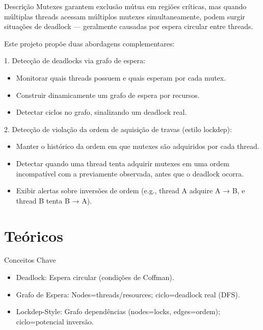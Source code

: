 \documentclass{beamer}
\begin{document}
\begin{frame}{Descrição}
Mutexes garantem exclusão mútua em regiões críticas, mas
quando múltiplas threads acessam múltiplos mutexes
simultaneamente, podem surgir situações de deadlock —
geralmente causadas por espera circular entre threads.

Este projeto propõe duas abordagens complementares:

\item 1. Detecção de deadlocks via grafo de espera:
\begin{itemize}
    \item Monitorar quais threads possuem e quais esperam por cada mutex.
    \item Construir dinamicamente um grafo de espera por recursos.
    \item Detectar ciclos no grafo, sinalizando um deadlock real.
\end{itemize}

\item 2. Detecção de violação da ordem de aquisição de travas (estilo lockdep):
\begin{itemize}
    \item Manter o histórico da ordem em que mutexes são adquiridos por cada thread.
    \item Detectar quando uma thread tenta adquirir mutexes em uma ordem incompatível com a previamente observada, antes que o deadlock ocorra.
    \item Exibir alertas sobre inversões de ordem (e.g., thread A adquire A → B, e thread B tenta B → A).
\end{itemize}
\end{frame}

\section{Teóricos}
\begin{frame}{Conceitos Chave}
  \begin{itemize}
    \item Deadlock: Espera circular (condições de Coffman).
    \item Grafo de Espera: Nodes=threads/resources; ciclo=deadlock real (DFS).
    \item Lockdep-Style: Grafo dependências (nodes=locks, edges=ordem); ciclo=potencial inversão.
  \end{itemize}
\end{frame}
\end{document}
